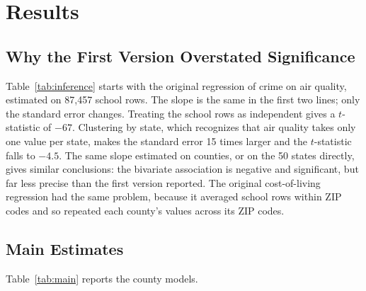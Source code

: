\documentclass[12pt,letterpaper]{report}
\begin{document}
\chapter{Results}\label{ch:results}

\section{Why the First Version Overstated Significance}
Table~\ref{tab:inference} starts with the original regression of crime on air quality,
estimated on 87,457 school rows. The slope is the same in the first two lines; only the
standard error changes. Treating the school rows as independent gives a $t$-statistic of
$-67$. Clustering by state, which recognizes that air quality takes only one value per
state, makes the standard error 15 times larger and the $t$-statistic falls to $-4.5$. The
same slope estimated on counties, or on the 50 states directly, gives similar conclusions:
the bivariate association is negative and significant, but far less precise than the first
version reported. The original cost-of-living regression had the same problem, because it
averaged school rows within ZIP codes and so repeated each county's values across its ZIP
codes.

\begin{table}[H]
\centering
\caption{Air quality and crime: the same bivariate slope under different units and standard
errors. Slope is crimes per 1,000 residents per percentage point of good-air days.}
\label{tab:inference}
\small

\end{table}

\section{Main Estimates}
Table~\ref{tab:main} reports the county models.

\begin{table}[H]
\centering
\caption{County regressions of crime per 1,000 residents. Standard errors clustered by state
in parentheses. $^{*}p<0.1$, $^{**}p<0.05$, $^{***}p<0.01$. Model~(5) drops the District of Columbia and Utah, which have one county each in the sample.}
\label{tab:main}
\small

\end{table}
\end{document}
